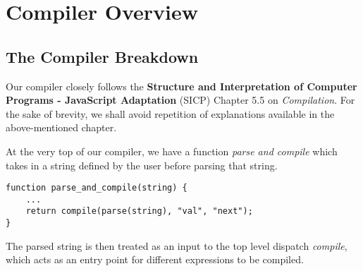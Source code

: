 \setcounter{chapter}{1}




\chapter{Compiler Overview}

\section{The Compiler Breakdown}
Our compiler closely follows the \textbf{Structure and Interpretation of Computer Programs \-- JavaScript Adaptation} (SICP) Chapter 5.5 on \textit{Compilation}. For the sake of brevity, we shall avoid repetition of explanations available in the above-mentioned  chapter.\newline

At the very top of our compiler, we have a function \textit{parse and compile} which takes in a string defined by the user before parsing that string.

\begin{lstlisting}[caption=Entry point for users]
function parse_and_compile(string) {
	...
	return compile(parse(string), "val", "next");
}
\end{lstlisting}

\noindent
The parsed string is then treated as an input to the top level dispatch \textit{compile}, which acts as an entry point for different expressions to be compiled.

